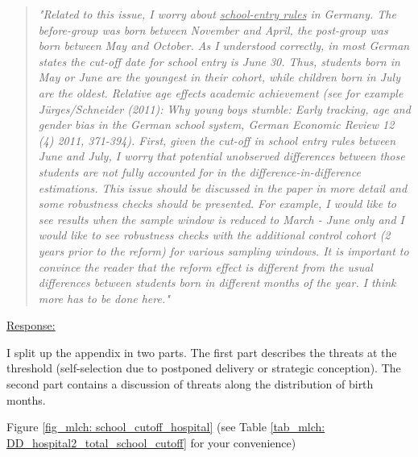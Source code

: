 \begin{quote}
	\textit{"Related to this issue, I worry about \underline{school-entry rules} in Germany. The before-group was born between November and April, the post-group was born between May and October. As I understood correctly, in most German states the cut-off date for school entry is June 30. Thus, students born in May or June are the youngest in their cohort, while children born in July are the oldest. Relative age effects academic achievement (see for example Jürges/Schneider (2011): Why young boys stumble: Early tracking, age and gender bias in the German school system, German Economic Review 12 (4) 2011, 371-394). First, given the cut-off in school entry rules between June and July, I worry that potential unobserved differences between those students are not fully accounted for in the difference-in-difference estimations. This issue should be discussed in the paper in more detail and some robustness checks should be presented. For example, I would like to see results when the sample window is reduced to March - June only and I would like to see robustness checks with the additional control cohort (2 years prior to the reform) for various sampling windows. It is important to convince the reader that the reform effect is different from the usual differences between students born in different months of the year. I think more has to be done here."}
\end{quote}
\underline{Response:}


I split up the appendix in two parts. The first part describes the threats at the threshold (self-selection due to postponed delivery or strategic conception). The second part contains a discussion of threats along the distribution of birth months. 


Figure \ref{fig_mlch: school_cutoff_hospital} (see Table \ref{tab_mlch: DD_hospital2_total_school_cutoff} for your convenience)




